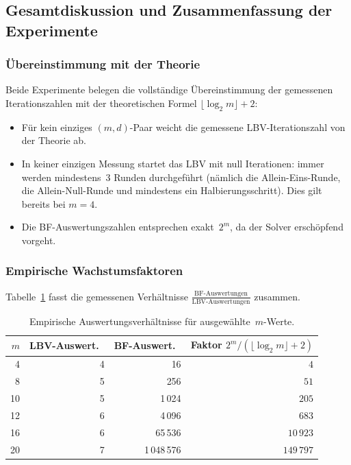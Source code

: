 ﻿\documentclass[a4paper,12pt]{article}
\theoremstyle{definition}
\begin{document}
\subsection{Gesamtdiskussion und Zusammenfassung der Experimente}
\label{subsec:exp-zusammenfassung}

\subsubsection{Übereinstimmung mit der Theorie}

Beide Experimente belegen die vollständige Übereinstimmung der gemessenen Iterationszahlen
mit der theoretischen Formel $\lfloor\log_2 m\rfloor + 2$:

\begin{itemize}
  \item Für kein einziges $(m, d)$-Paar weicht die gemessene LBV-Iterationszahl von der
    Theorie ab.
  \item In keiner einzigen Messung startet das LBV mit null Iterationen: immer werden
    mindestens~3 Runden durchgeführt (nämlich die Allein-Eins-Runde, die Allein-Null-Runde
    und mindestens ein Halbierungsschritt).  Dies gilt bereits bei $m = 4$.
  \item Die BF-Auswertungszahlen entsprechen exakt~$2^m$, da der Solver erschöpfend
    vorgeht.
\end{itemize}

\subsubsection{Empirische Wachstumsfaktoren}

Tabelle~\ref{tab:exp-faktoren} fasst die gemessenen Verhältnisse
$\frac{\text{BF-Auswertungen}}{\text{LBV-Auswertungen}}$ zusammen.

\begin{table}[h]
  \centering
  \begin{tabular}{rrrr}
    \toprule
    $m$ & LBV-Auswert.\ & BF-Auswert.\ & Faktor $2^m / (\lfloor\log_2 m\rfloor+2)$ \\
    \midrule
    4  & 4 & 16        & ~~~~~~~~~$4$ \\
    8  & 5 & 256       & ~~~~~~~~~~~~~~$51$ \\
    10 & 5 & 1\,024    & ~~~~~~~~~~~~~$205$ \\
    12 & 6 & 4\,096    & ~~~~~~~~~~~~~$683$ \\
    16 & 6 & 65\,536   & ~~~~~~~~~~$10\,923$ \\
    20 & 7 & 1\,048\,576 & ~~~~~~~$149\,797$ \\
    \bottomrule
  \end{tabular}
  \caption{Empirische Auswertungsverhältnisse für ausgewählte~$m$-Werte.}
  \label{tab:exp-faktoren}
\end{table}
\end{document}
